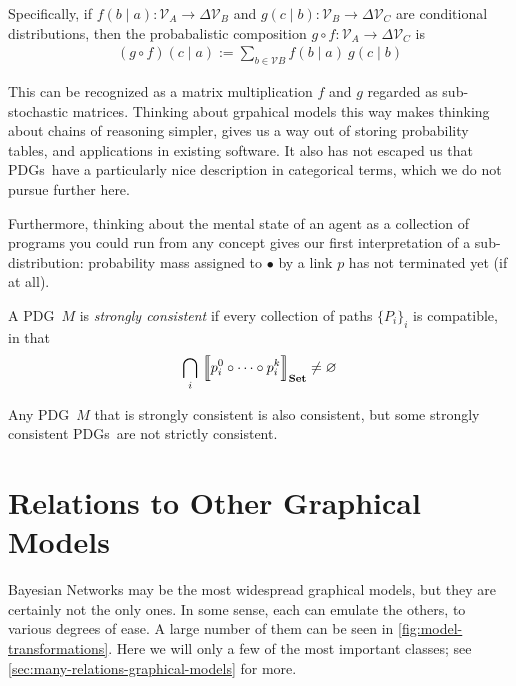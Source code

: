 \documentclass{article}
\newcommand\changeon{\color{note-fg} }
\newcommand\changeoff{\color{black} }
\newcommand\Set{\textbf{Set}}
\newcommand{\MN}{PDG}
\newcommand{\MNs}{\MN s}
\begin{document}
	Specifically, if $f(b \mid a) : \mathcal V_A \to \Delta \mathcal V_B$ and $g(c \mid b) : \mathcal V_B \to \Delta \mathcal V_C$ are conditional distributions, then the probabalistic composition $g\circ f : \mathcal V_A \to \Delta\mathcal V_C$ is
	\begin{align*}
			(g\circ  f) (c \mid a) :=  \sum_{b \in \mathcal V B}\!\! f (b \mid a)\ g(c \mid b)
	\end{align*}
	
	This can be recognized as a matrix multiplication $f$ and $g$ regarded as sub-stochastic matrices.
	Thinking about grpahical models this way makes thinking about chains of reasoning simpler, gives us a way out of storing probability tables, and applications in existing software. It also has not escaped us that \MNs\ have a particularly nice description in categorical terms, which we do not pursue further here.
	
	Furthermore, thinking about the mental state of an agent as a collection of programs you could run from any concept gives our first interpretation of a sub-distribution: probability mass assigned to $\bullet$ by a link $p$ has not terminated yet (if at all). 
	
	\begin{defn}
		A \MN\ $M$ is \emph{strongly consistent} if every collection of paths $\{P_i\}_i$ is compatible, in that 
		$$\bigcap_i\ \bbr*{\vphantom{\Big|}p_i^0\circ \cdots\circ p_i^k}_\Set \neq \varnothing$$
	\end{defn}

	\begin{prop}
		Any \MN\ $M$ that is strongly consistent is also consistent, but some strongly consistent \MNs\ are not strictly consistent.
	\end{prop}

	
	\changeoff

	\section{Relations to Other Graphical Models}\label{sec:other-graphical-models}
	\changeon
	Bayesian Networks may be the most widespread graphical models, but they are certainly not the only ones. In some sense, each can emulate the others, to various degrees of ease. A large number of them can be seen in \cref{fig:model-transformations}. Here we will only a few of the most important classes; see \cref{sec:many-relations-graphical-models} for more.
\end{document}
